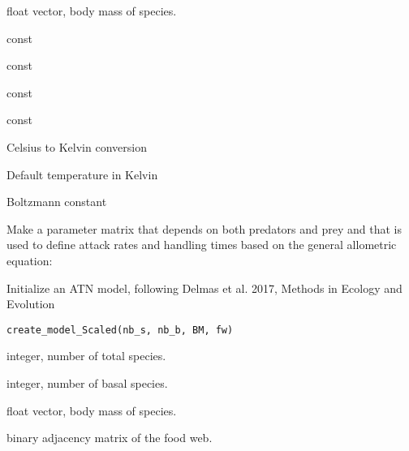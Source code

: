 \documentclass[letterpaper]{book}
\begin{document}
\begin{Arguments}
\begin{ldescription}
\item[\code{BM}] float vector, body mass of species.

\item[\code{b0}] const

\item[\code{bprey}] const

\item[\code{bpred}] const

\item[\code{E}] const

\item[\code{T.K, }] Celsius to Kelvin conversion

\item[\code{T0, }] Default temperature in Kelvin

\item[\code{k, }] Boltzmann constant
\end{ldescription}
\end{Arguments}
%
\begin{Details}\relax
Make a parameter matrix that depends on both predators
and prey and that is used to define attack rates and handling
times based on the general allometric equation:
\end{Details}
%
\begin{Description}\relax
Initialize an ATN model, following Delmas et al. 2017, Methods in Ecology and Evolution
\end{Description}
%
\begin{Usage}
\begin{verbatim}
create_model_Scaled(nb_s, nb_b, BM, fw)
\end{verbatim}
\end{Usage}
%
\begin{Arguments}
\begin{ldescription}
\item[\code{nb\_s}] integer, number of total species.

\item[\code{nb\_b}] integer, number of basal species.

\item[\code{BM}] float vector, body mass of species.

\item[\code{fw}] binary adjacency matrix of the food web.
\end{ldescription}
\end{Arguments}
\end{document}
